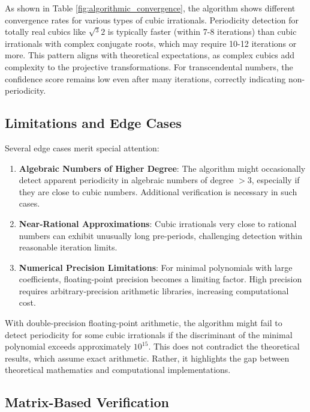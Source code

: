 As shown in Table \ref{fig:algorithmic_convergence}, the \HAPD{} algorithm shows different convergence rates for various types of cubic irrationals. Periodicity detection for totally real cubics like $\sqrt{^3}{2}$ is typically faster (within 7-8 iterations) than cubic irrationals with complex conjugate roots, which may require 10-12 iterations or more. This pattern aligns with theoretical expectations, as complex cubics add complexity to the projective transformations. For transcendental numbers, the confidence score remains low even after many iterations, correctly indicating non-periodicity.

\subsection{Limitations and Edge Cases}

Several edge cases merit special attention:

\begin{enumerate}
\item \textbf{Algebraic Numbers of Higher Degree}: The algorithm might occasionally detect apparent periodicity in algebraic numbers of degree $> 3$, especially if they are close to cubic numbers. Additional verification is necessary in such cases.

\item \textbf{Near-Rational Approximations}: Cubic irrationals very close to rational numbers can exhibit unusually long pre-periods, challenging detection within reasonable iteration limits.

\item \textbf{Numerical Precision Limitations}: For minimal polynomials with large coefficients, floating-point precision becomes a limiting factor. High precision requires arbitrary-precision arithmetic libraries, increasing computational cost.
\end{enumerate}

With double-precision floating-point arithmetic, the algorithm might fail to detect periodicity for some cubic irrationals if the discriminant of the minimal polynomial exceeds approximately $10^{15}$. This does not contradict the theoretical results, which assume exact arithmetic. Rather, it highlights the gap between theoretical mathematics and computational implementations.

\subsection{Matrix-Based Verification}

